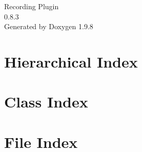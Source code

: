 \documentclass[twoside]{book}
\newcommand{\+}{\discretionary{\mbox{\scriptsize$\hookleftarrow$}}{}{}}
\newcommand{\clearemptydoublepage}{%
    \newpage{\pagestyle{empty}\cleardoublepage}%
  }
\begin{document}
  \raggedbottom
    \hypersetup{pageanchor=false,
                bookmarksnumbered=true,
                pdfencoding=unicode
               }
  \begin{titlepage}
  \vspace*{7cm}
  \begin{center}%
  {\Large Recording Plugin}\\
  [1ex]\large 0.\+8.\+3 \\
  \vspace*{1cm}
  {\large Generated by Doxygen 1.9.8}\\
  \end{center}
  \end{titlepage}
  \clearemptydoublepage
  \tableofcontents
  \clearemptydoublepage
  \hypersetup{pageanchor=true}

\chapter{Hierarchical Index}

\chapter{Class Index}

\chapter{File Index}

\end{document}
